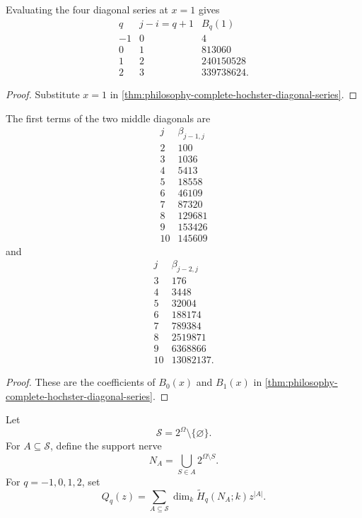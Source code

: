 \begin{corollary}
\label{cor:philosophy-hochster-diagonal-masses}
Evaluating the four diagonal series at $x=1$ gives
$$
\begin{array}{c|r|r}
  q & j-i=q+1 & B_{q}(1)\\
  \hline
  -1 & 0 & 4\\
  0 & 1 & 813060\\
  1 & 2 & 240150528\\
  2 & 3 & 339738624.
\end{array}
$$
\end{corollary}
\begin{proof}
Substitute $x=1$ in
\autoref{thm:philosophy-complete-hochster-diagonal-series}.
\end{proof}

\begin{corollary}
\label{cor:philosophy-low-degree-diagonal-entries}
The first terms of the two middle diagonals are
$$
\begin{array}{c|r}
  j & \beta_{j-1,j}\\
  \hline
  2 & 100\\
  3 & 1036\\
  4 & 5413\\
  5 & 18558\\
  6 & 46109\\
  7 & 87320\\
  8 & 129681\\
  9 & 153426\\
  10 & 145609
\end{array}
$$
and
$$
\begin{array}{c|r}
  j & \beta_{j-2,j}\\
  \hline
  3 & 176\\
  4 & 3448\\
  5 & 32004\\
  6 & 188174\\
  7 & 789384\\
  8 & 2519871\\
  9 & 6368866\\
  10 & 13082137.
\end{array}
$$
\end{corollary}
\begin{proof}
These are the coefficients of $B_{0}(x)$ and $B_{1}(x)$ in
\autoref{thm:philosophy-complete-hochster-diagonal-series}.
\end{proof}

\begin{definition}
\label{def:philosophy-support-level-betti-polynomials}
Let
$$
  \mathcal{S}=2^{\Omega}\setminus\{\varnothing\}.
$$
For $A\subseteq\mathcal{S}$, define the support nerve
$$
  N_{A}
  =
  \bigcup_{S\in A}2^{\Omega\setminus S}.
$$
For $q=-1,0,1,2$, set
$$
  Q_{q}(z)
  =
  \sum_{A\subseteq\mathcal{S}}
  \dim_{k}\widetilde{H}_{q}(N_{A};k)z^{|A|}.
$$
\end{definition}

